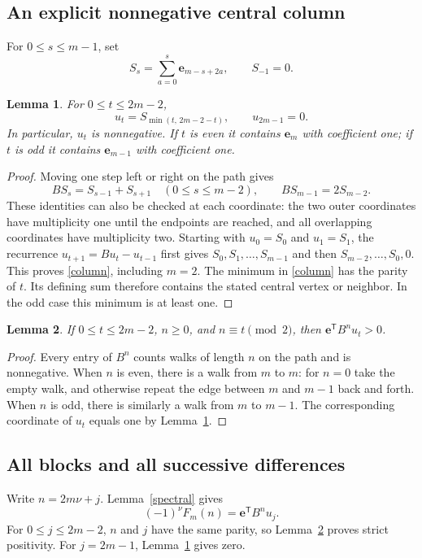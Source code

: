 \documentclass[11pt]{article}
\newtheorem{lemma}{Lemma}
\newcommand{\e}{\mathbf e}
\begin{document}
\subsection*{An explicit nonnegative central column}
For $0\le s\le m-1$, set
\[
 S_s=\sum_{a=0}^s\e_{m-s+2a},\qquad S_{-1}=0.
\]
\begin{lemma}\label{wave}
For $0\le t\le2m-2$,
\begin{equation}\label{column}
 u_t=S_{\min(t,\,2m-2-t)},\qquad u_{2m-1}=0.
\end{equation}
In particular, $u_t$ is nonnegative. If $t$ is even it contains
$\e_m$ with coefficient one; if $t$ is odd it contains
$\e_{m-1}$ with coefficient one.
\end{lemma}
\begin{proof}
Moving one step left or right on the path gives
\[
 BS_s=S_{s-1}+S_{s+1}\quad(0\le s\le m-2),
 \qquad BS_{m-1}=2S_{m-2}.
\]
These identities can also be checked at each coordinate: the two
outer coordinates have multiplicity one until the endpoints are
reached, and all overlapping coordinates have multiplicity two.
Starting with $u_0=S_0$ and $u_1=S_1$, the recurrence
$u_{t+1}=Bu_t-u_{t-1}$ first gives
$S_0,S_1,\ldots,S_{m-1}$ and then
$S_{m-2},\ldots,S_0,0$. This proves \eqref{column}, including $m=2$.
The minimum in \eqref{column} has the parity of $t$.
Its defining sum therefore contains the stated central vertex or
neighbor. In the odd case this minimum is at least one.
\end{proof}

\begin{lemma}\label{positive}
If $0\le t\le2m-2$, $n\ge0$, and $n\equiv t\pmod2$, then
$\e^{\mathsf T}B^n u_t>0$.
\end{lemma}
\begin{proof}
Every entry of $B^n$ counts walks of length $n$ on the path and
is nonnegative. When $n$ is even, there is a walk from $m$ to
$m$: for $n=0$ take the empty walk, and otherwise repeat the
edge between $m$ and $m-1$ back and forth. When $n$ is odd,
there is similarly a walk from $m$ to $m-1$. The corresponding
coordinate of $u_t$ equals one by Lemma~\ref{wave}.
\end{proof}

\subsection*{All blocks and all successive differences}
Write $n=2m\nu+j$. Lemma~\ref{spectral} gives
\begin{equation}\label{signed}
 (-1)^\nu F_m(n)=\e^{\mathsf T}B^n u_j.
\end{equation}
For $0\le j\le2m-2$, $n$ and $j$ have the same parity, so
Lemma~\ref{positive} proves strict positivity. For $j=2m-1$,
Lemma~\ref{wave} gives zero.
\end{document}
